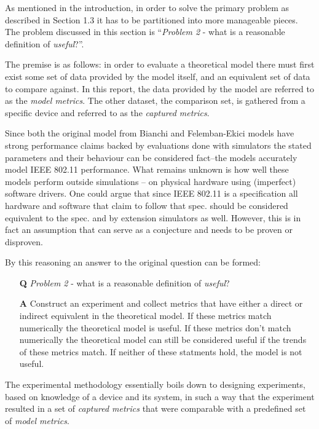 As mentioned in the introduction, in order to solve the primary problem as
described in Section 1.3 it has to be partitioned into more manageable pieces.
The problem discussed in this section is ``\emph{Problem 2} - what is a
reasonable definition of \emph{useful}?''.

The premise is as follows: in order to evaluate a theoretical model there must
first exist some set of data provided by the model itself, and an equivalent
set of data to compare against. In this report, the data provided by the model
are referred to as the \emph{model metrics}. The other dataset, the comparison
set, is gathered from a specific device and referred to as the \emph{captured
metrics}.

Since both the original model from Bianchi and Felemban-Ekici models have
strong performance claims backed by evaluations done with simulators the
stated parameters and their behaviour can be considered fact--the models
accurately model IEEE 802.11 performance. What remains unknown is how well
these models perform outside simulations -- on physical hardware using
(imperfect) software drivers. One could argue that since IEEE 802.11 is a
specification all hardware and software that claim to follow that spec. should
be considered equivalent to the spec. and by extension simulators as well.
However, this is in fact an assumption that can serve as a conjecture and
needs to be proven or disproven.

By this reasoning an answer to the original question can be formed:

\begin{itemize}

    \item[\textbf{Q}] \emph{Problem 2} - what is a reasonable definition of \emph{useful}?

    \item[\textbf{A}] Construct an experiment and collect metrics that have
either a direct or indirect equivalent in the theoretical model. If these
metrics match numerically the theoretical model is useful. If these metrics
don't match numerically the theoretical model can still be considered useful
if the trends of these metrics match. If neither of these statments hold, the
model is not useful.

\end{itemize}

The experimental methodology essentially boils down to designing experiments,
based on knowledge of a device and its system, in such a way that the
experiment resulted in a set of \emph{captured metrics} that were comparable
with a predefined set of \emph{model metrics}.

